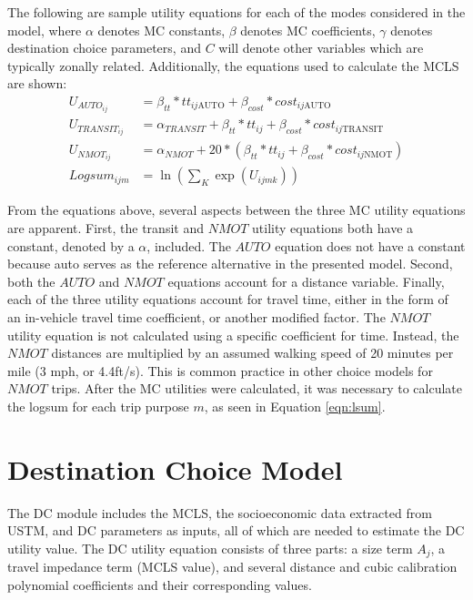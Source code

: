 The following are sample utility equations for each of the modes considered in
the model, where $\alpha$ denotes MC constants, $\beta$ denotes
MC coefficients, $\gamma$ denotes destination choice parameters, and
$C$ will denote other variables which are typically zonally related. Additionally,
the equations used to calculate the MCLS are shown:
\begin{align}
U_{{AUTO}_{ij}} &= \beta_{tt} * tt_{ij\mathrm{AUTO}} + \beta_{cost}* cost_{ij\mathrm{AUTO}} \\
U_{{TRANSIT}_{ij}} &= \alpha_{TRANSIT} + \beta_{tt} * tt_{ij} + \beta_{cost} * cost_{ij\mathrm{TRANSIT}} \\
U_{{NMOT}_{ij}} &= \alpha_{NMOT} + 20 * (\beta_{tt{}} * tt_{ij} + \beta_{cost} * cost_{ij\mathrm{NMOT}}) \\
Logsum_{ijm} &= \ln(\sum_K \exp (U_{ijmk})) \label{eqn:lsum}
\end{align}

From the equations above, several aspects between the three MC utility equations are
apparent. First, the transit and $NMOT$ utility equations both have a constant, denoted by a $\alpha$,
included. The $AUTO$ equation does not have a constant because auto serves as the reference
alternative in the presented model. Second, both the $AUTO$ and $NMOT$ equations account for a
distance variable. Finally, each of the three utility equations account for travel time, either in the
form of an in-vehicle travel time coefficient, or another modified factor. The $NMOT$ utility
equation is not calculated using a specific coefficient for time. Instead, the $NMOT$ distances are
multiplied by an assumed walking speed of 20 minutes per mile (3 mph, or 4.4ft/s). This is common practice in other
choice models for $NMOT$ trips. After the MC utilities were calculated, it was necessary to calculate the logsum for
each trip purpose \(m\), as seen in Equation \ref{eqn:lsum}.

\section{Destination Choice Model}
\label{sec:dc}
The DC module
includes the MCLS, the socioeconomic data extracted
from USTM, and DC parameters as inputs, all of which are needed to estimate the DC utility value.
The DC utility equation consists of three parts: a size term \(A_j\),
a travel impedance term (MCLS value), and several distance and cubic
calibration polynomial coefficients and their corresponding values.

